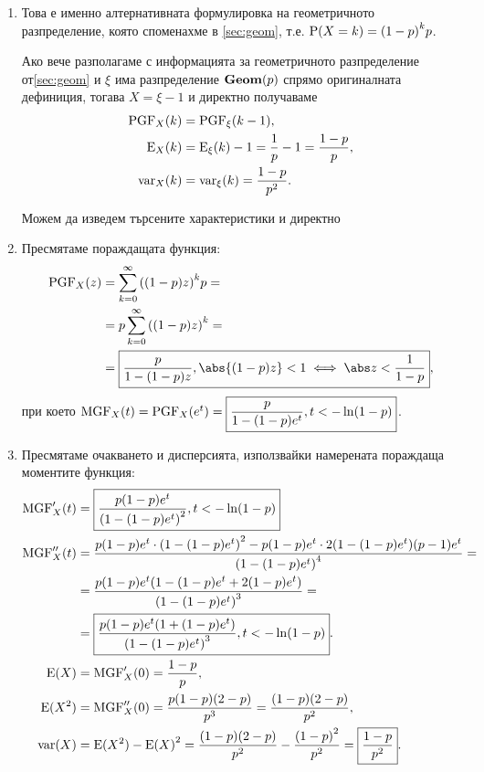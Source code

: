 \documentclass{../../common/topic}
\begin{document}
\begin{solution}
  \hfill
  \begin{enumerate}[label=\alph*)]
    \item Това е именно алтернативната формулировка на геометричното разпределение, която споменахме в \cref{sec:geom}, т.е. \( \operatorname{P}(X = k) = {(1-p)}^k p \).

    Ако вече разполагаме с информацията за геометричното разпределение от\cref{sec:geom} и \( \xi \) има разпределение \( \operatorname{\mathbf{Geom}}(p) \) спрямо оригиналната дефиниция, тогава \( X = \xi - 1 \) и директно получаваме
    \begin{align*}
      \operatorname{PGF}_X(k) &= \operatorname{PGF}_\xi(k-1), \\
      \operatorname{E}_X(k) &= \operatorname{E}_\xi(k) - 1 = \frac 1 p - 1 = \frac {1-p} p, \\
      \operatorname{var}_X(k) &= \operatorname{var}_\xi(k) = \frac {1-p} {p^2}.
    \end{align*}

    Можем да изведем търсените характеристики и директно
    \item Пресмятаме пораждащата функция:
    \begin{align*}
      \PGF_X(z)
      &=
      \sum_{k=0}^\infty {((1-p) z)}^k p
      = \\ &=
      p \sum_{k=0}^\infty {((1-p) z)}^k
      = \\ &=
      \boxed{\frac p {1 - (1-p)z}, \abs{(1-p) z} < 1 \iff \abs z < \frac 1 {1-p}},
    \end{align*}
    при което \( \operatorname{MGF}_X(t) = \operatorname{PGF}_X(e^t) = \boxed{\frac p {1 - (1-p)e^t}, t < -\ln(1-p)} \).

    \item Пресмятаме очакването и дисперсията, използвайки намерената пораждаща моментите функция:
    \begingroup
    \allowdisplaybreaks
    \begin{align*}
      \operatorname{MGF}'_X(t)
      &=
      \boxed{\frac {p (1-p) e^t} {{(1-(1-p)e^t)}^2}, t < -\ln(1-p)}
      \\
      \operatorname{MGF}''_X(t)
      &=
      \frac {p (1-p) e^t \cdot {(1-(1-p)e^t)}^2 - p (1-p) e^t \cdot 2 (1-(1-p)e^t)(p-1) e^t} {{(1-(1-p)e^t)}^4}
      = \\ &=
      \frac {p (1-p) e^t (1-(1-p)e^t+2(1-p)e^t)} {{(1-(1-p)e^t)}^3}
      = \\ &=
      \boxed{\frac {p (1-p) e^t(1+(1-p)e^t)} {{(1-(1-p)e^t)}^3}, t < -\ln(1-p)}.
      \\
      \operatorname{E}(X)
      &=
      \operatorname{MGF}'_X(0)
      =
      \frac {1-p} p,
      \\
      \operatorname{E}(X^2)
      &=
      \operatorname{MGF}''_X(0)
      =
      \frac {p(1-p)(2-p)} {p^3}
      =
      \frac {(1-p)(2-p)} {p^2},
      \\
      \operatorname{var}(X)
      &=
      \operatorname{E}(X^2) - {\operatorname{E}(X)}^2
      =
      \frac {(1-p)(2-p)} {p^2} - \frac {{(1-p)}^2} {p^2}
      =
      \boxed{\frac {1-p} {p^2}}.
    \end{align*}
    \endgroup


\end{enumerate}
\end{solution}
\end{document}
